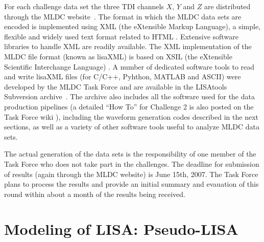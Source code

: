 \documentclass[12pt]{iopart}
\begin{document}
For each challenge data set the three TDI channels $X$, $Y$ and $Z$ are distributed through the MLDC website~\cite{MLDCweb}. The format in which the MLDC data sets are encoded is implemented using XML (the eXtensible Markup Language), a simple, flexible and widely used text format related to HTML \cite{xml}. Extensive software libraries to handle XML are readily available. The XML implementation of the MLDC file format (known as lisaXML) is based on XSIL (the eXtensible Scientific Interchange Language) \cite{xsil}. A number of dedicated software tools to read and write lisaXML files (for C/C++, Pyhthon, MATLAB and ASCII) were developed by the MLDC Task Force and are available in the LISAtools Subversion archive~\cite{lisatools}. The archive also includes all the software used for the data production pipelines (a detailed ``How To'' for Challenge 2 is also posted on the Task Force wiki \cite{MLDCwiki}), including the waveform generation codes described in the next sections, as well as a variety of other software tools useful to analyze MLDC data sets.

The actual generation of the data sets is the responsibility of one member of the Task Force who does not take part in the challenges. The deadline for submission of results (again through the MLDC website) is June 15th, 2007. The Task Force plans to process the results and provide an initial summary and evauation of this round within about a month of the results being received.

\section{Modeling of LISA: Pseudo-LISA}
\label{s:lisa}
\end{document}
